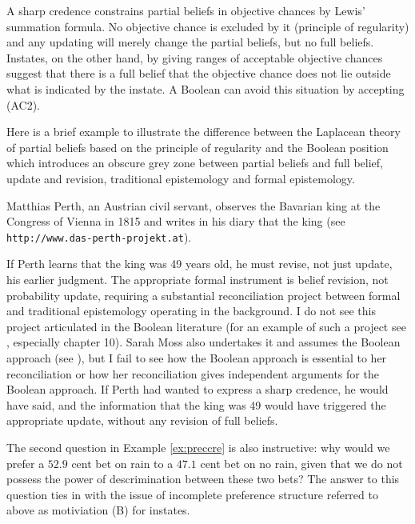 \documentclass[11pt]{article}
\begin{document}
A sharp credence constrains partial beliefs in objective chances by
Lewis' summation formula. No objective chance is excluded by it
(principle of regularity) and any updating will merely change the
partial beliefs, but no full beliefs. Instates, on the other hand, by
giving ranges of acceptable objective chances suggest that there is a
full belief that the objective chance does not lie outside what is
indicated by the instate. A Boolean can avoid this situation by
accepting (AC2).

Here is a brief example to illustrate the difference between the
Laplacean theory of partial beliefs based on the principle of
regularity and the Boolean position which introduces an obscure grey
zone between partial beliefs and full belief, update and revision,
traditional epistemology and formal epistemology.

\begin{quotex}
  \label{ex:king} Matthias Perth, an Austrian
  civil servant, observes the Bavarian king at the Congress of Vienna
  in 1815 and writes in his diary that the king  (see
  \texttt{http://www.das-perth-projekt.at}).
\end{quotex}

If Perth learns that the king was 49 years old, he must revise, not
just update, his earlier judgment. The appropriate formal instrument
is belief revision, not probability update, requiring a substantial
reconciliation project between formal and traditional epistemology
operating in the background. I do not see this project articulated in
the Boolean literature (for an example of such a project see
, especially chapter 10). Sarah Moss also
undertakes it and assumes the Boolean approach (see
), but I fail to see how the Boolean approach is
essential to her reconciliation or how her reconciliation gives
independent arguments for the Boolean approach. If Perth had wanted to
express a sharp credence, he would have said,  and the information that the king
was 49 would have triggered the appropriate update, without any
revision of full beliefs.

The second question in Example \ref{ex:preccre} is also instructive:
why would we prefer a $52.9$ cent bet on rain to a $47.1$ cent bet on
no rain, given that we do not possess the power of descrimination
between these two bets? The answer to this question ties in with the
issue of incomplete preference structure referred to above as
motiviation (B) for instates.
\end{document}
